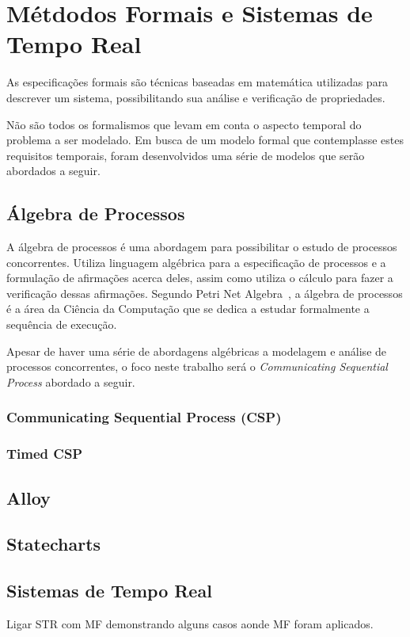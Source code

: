 \section{Métdodos Formais e Sistemas de Tempo Real}
\label{sec:MFeSTR}
As especificações formais são técnicas baseadas em matemática utilizadas para descrever um sistema,
possibilitando sua análise e verificação de propriedades.

Não são todos os formalismos que levam em conta o aspecto temporal do problema a ser modelado.
Em busca de um modelo formal que contemplasse estes requisitos temporais, foram desenvolvidos uma série
de modelos que serão abordados a seguir.

\subsection{Álgebra de Processos}
A álgebra de processos é uma abordagem para possibilitar o estudo de processos concorrentes. Utiliza linguagem algébrica
para a especificação de processos e a formulação de afirmações acerca deles, assim como utiliza o cálculo para fazer a
verificação dessas afirmações. Segundo Petri Net Algebra~\cite{books/daglib/0003970}, a álgebra de processos é a área da
Ciência da Computação que se dedica a estudar formalmente a sequência de execução.

Apesar de haver uma série de abordagens algébricas a modelagem e análise de processos concorrentes, o foco neste trabalho
será o \textit{Communicating Sequential Process} abordado a seguir.

\subsubsection{Communicating Sequential Process (CSP)}


\subsubsection{Timed CSP}


\subsection{Alloy}


\subsection{Statecharts}


\subsection{Sistemas de Tempo Real}
Ligar STR com MF demonstrando alguns casos aonde MF foram aplicados.

